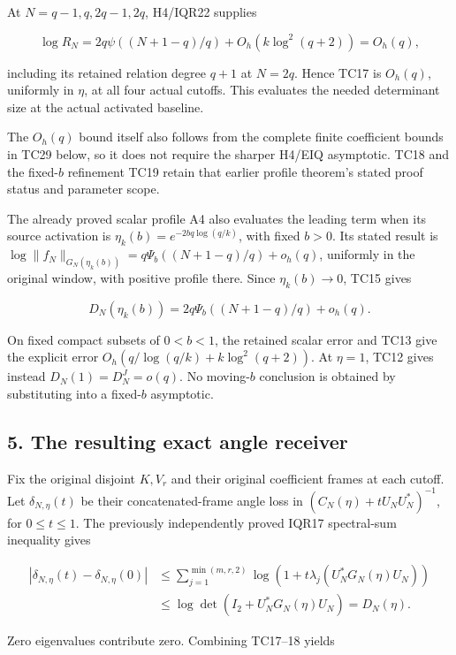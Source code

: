 \documentclass[11pt]{article}
\begin{document}
At \(N=q-1,q,2q-1,2q\), H4/IQR22 supplies

\[
\log R_N=2q\psi((N+1-q)/q)
+O_h(k\log^2(q+2))=O_h(q),
\tag{TC18}
\]

including its retained relation degree \(q+1\) at \(N=2q\). Hence TC17 is \(O_h(q)\), uniformly in \(\eta\), at all four actual cutoffs. This evaluates the needed determinant size at the actual activated baseline.

The \(O_h(q)\) bound itself also follows from the complete finite coefficient bounds in TC29 below, so it does not require the sharper H4/EIQ asymptotic. TC18 and the fixed-\(b\) refinement TC19 retain that earlier profile theorem's stated proof status and parameter scope.

The already proved scalar profile A4 also evaluates the leading term when its source activation is \(\eta_k(b)=e^{-2bq\log(q/k)}\), with fixed \(b>0\). Its stated result is \(\log\|f_N\|_{G_N(\eta_k(b))}=q\Psi_b((N+1-q)/q)+o_h(q)\), uniformly in the original window, with positive profile there. Since \(\eta_k(b)\to0\), TC15 gives

\[
D_N(\eta_k(b))=2q\Psi_b((N+1-q)/q)+o_h(q).
\tag{TC19}
\]

On fixed compact subsets of \(0<b<1\), the retained scalar error and TC13 give the explicit error \(O_h(q/\log(q/k)+k\log^2(q+2))\). At \(\eta=1\), TC12 gives instead \(D_N(1)=D_N^J=o(q)\). No moving-\(b\) conclusion is obtained by substituting into a fixed-\(b\) asymptotic.

\subsection{5. The resulting exact angle receiver}\label{the-resulting-exact-angle-receiver}

Fix the original disjoint \(K,V_r\) and their original coefficient frames at each cutoff. Let \(\delta_{N,\eta}(t)\) be their concatenated-frame angle loss in \((C_N(\eta)+tU_NU_N^*)^{-1}\), for \(0\le t\le1\). The previously independently proved IQR17 spectral-sum inequality gives

\[
\begin{aligned}
|\delta_{N,\eta}(t)-\delta_{N,\eta}(0)|
&\le\sum_{j=1}^{\min(m,r,2)}\log(1+t\lambda_j(U_N^*G_N(\eta)U_N))\\
&\le\log\det(I_2+U_N^*G_N(\eta)U_N)
=D_N(\eta).
\end{aligned}
\tag{TC20}
\]

Zero eigenvalues contribute zero. Combining TC17--18 yields
\end{document}
